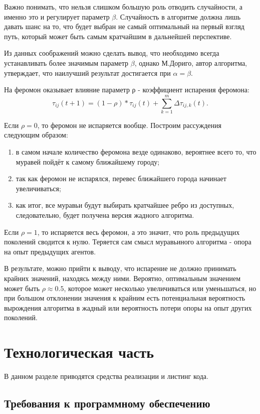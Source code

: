 \documentclass[12pt,a4paper]{scrartcl}
\begin{document}
Важно понимать, что нельзя слишком большую роль отводить случайности, а именно это и регулирует параметр $\beta$. Случайность в алгоритме должна лишь давать шанс на то, что будет выбран не самый оптимальный на первый взгляд путь, который может быть самым кратчайшим в дальнейшей перспективе.

Из данных соображений можно сделать вывод, что необходимо всегда устанавливать более значимым параметр $\beta$, однако М.Дориго, автор алгоритма, утверждает, что наилучший результат достигается при $\alpha = \beta$.

На феромон оказывает влияние параметр ρ - коэффициент испарения феромона:
\begin{equation*}
τ_{ij}(t+1) = (1-ρ) * τ_{ij}(t) + \sum \limits_{k=1}^m \Delta τ_{ij,k}(t).
\end{equation*}

Если $ρ = 0$, то феромон не испаряется вообще. Построим рассуждения следующим образом:
\begin{enumerate}
\item в самом начале количество феромона везде одинаково, вероятнее всего то, что муравей пойдёт к самому ближайшему городу; 
\item так как феромон не испарялся, перевес ближайшего города начинает увеличиваться;
\item как итог, все муравьи будут выбирать кратчайшее ребро из доступных, следовательно, будет получена версия жадного алгоритма.
\end{enumerate}

Если $ρ = 1$, то испаряется весь феромон, а это значит, что роль предыдущих поколений сводится к нулю. Теряется сам смысл муравьиного алгоритма - опора на опыт предыдущих агентов.

В результате, можно прийти к выводу, что испарение не должно принимать крайних значений, находясь между ними. Вероятно, оптимальным значением может быть $ρ \approx 0.5$, которое может несколько увеличиваться или уменьшаться, но при большом отклонении значения к крайним есть потенциальная вероятность вырождения алгоритма в жадный или вероятность потери опоры на опыт других поколений.

 \clearpage
\section{Технологическая часть}

В данном разделе приводятся средства реализации и листинг кода.

\subsection{Требования к программному обеспечению}
\end{document}

